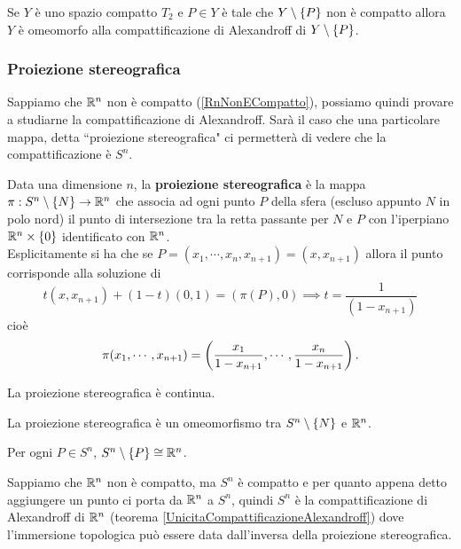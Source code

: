 \begin{multicols*}{2}
\begin{theorem}\label{UnicitaCompattificazioneAlexandroff}
Se $Y$ è uno spazio compatto $T_2$ e $P\in Y$ è tale che $Y\setminus\{P\}$ non è compatto allora $Y$ è omeomorfo alla compattificazione di Alexandroff di $Y\setminus\{P\}$.
\end{theorem}

\subsubsection{Proiezione stereografica}
Sappiamo che $\mathbb{R}^n$ non è compatto (\ref{RnNonECompatto}), possiamo quindi provare a studiarne la compattificazione di Alexandroff. Sarà il caso che una particolare mappa, detta ``proiezione stereografica" ci permetterà di vedere che la compattificazione è $S^n$.
\begin{definition}
Data una dimensione $n$, la \textbf{proiezione stereografica} è la mappa $\pi:S^n\setminus\{N\}\to\mathbb{R}^n$ che associa ad ogni punto $P$ della sfera (escluso appunto $N$ in polo nord) il punto di intersezione tra la retta passante per $N$ e $P$ con l'iperpiano $\mathbb{R}^n\times \{0\}$ identificato con $\mathbb{R}^n$.\\
Esplicitamente si ha che se $P=(x_1,\cdots,x_n,x_{n+1})=(x,x_{n+1})$ allora il punto corrisponde alla soluzione di
\[t(x,x_{n+1})+(1-t)(0,1)=(\pi(P),0)\implies t=\frac1{(1-x_{n+1})}\]
cioè
\[\pi(x_1,\cdots,x_{n+1})=\left(\frac{x_1}{1-x_{n+1}},\cdots, \frac{x_n}{1-x_{n+1}}\right).\]
\end{definition}
\begin{remark}
La proiezione stereografica è continua.
\end{remark}

\begin{theorem}
La proiezione stereografica è un omeomorfismo tra $S^n\setminus\{N\}$ e $\mathbb{R}^n$.
\end{theorem}
\begin{corollary}
Per ogni $P\in S^{n}$, $S^n\setminus\{P\}\cong \mathbb{R}^n$.
\end{corollary}

\begin{remark}
Sappiamo che $\mathbb{R}^n$ non è compatto, ma $S^n$ è compatto e per quanto appena detto aggiungere un punto ci porta da $\mathbb{R}^n$ a $S^n$, quindi $S^n$ è la compattificazione di Alexandroff di $\mathbb{R}^n$ (teorema \ref{UnicitaCompattificazioneAlexandroff}) dove l'immersione topologica può essere data dall'inversa della proiezione stereografica.
\end{remark}


\end{multicols*}
